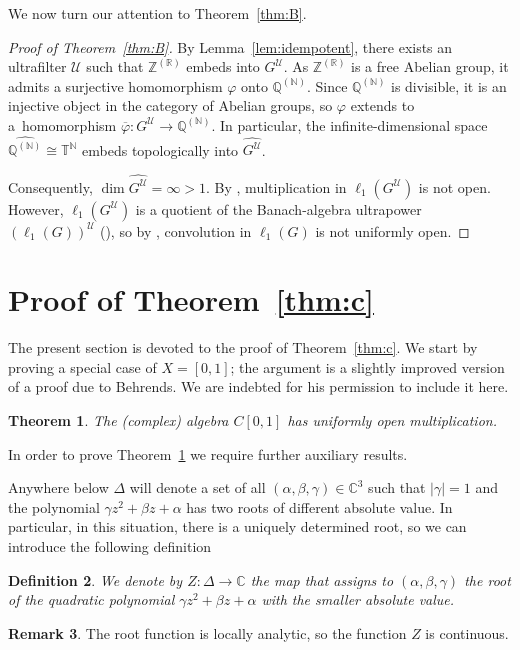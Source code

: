 \documentclass[12pt,fleqn]{amsart}
\newtheorem{theorem}{Theorem}[section]
\newtheorem{definition}[theorem]{Definition}
\theoremstyle{definition}
\newtheorem{remark}[theorem]{Remark}
\numberwithin{equation}{section}
\theoremstyle{remark}
\begin{document}
We now turn our attention to Theorem~\ref{thm:B}.
\begin{proof}[Proof of Theorem~\ref{thm:B}]
    By Lemma~\ref{lem:idempotent}, there exists an ultrafilter $\mathscr{U}$ such that $\mathbb Z^{(\mathbb R)}$ embeds into $G^{\mathscr{U}}$. As $\mathbb Z^{(\mathbb R)}$ is a free Abelian group, it admits a surjective homomorphism $\varphi$ onto $\mathbb{Q}^{(\mathbb N)}$. Since $\mathbb{Q}^{(\mathbb N)}$ is divisible, it is an injective object in the category of Abelian groups, so $\varphi$ extends to a~homomorphism $\overline{\varphi}\colon G^{\mathscr{U}}\to \mathbb{Q}^{(\mathbb N)}$. In particular, the infinite-dimensional space $\widehat{\mathbb{Q}^{(\mathbb N)}}\cong \mathbb T^{\mathbb N}$ embeds topologically into $\widehat{G^{\mathscr{U}}}$. 
    
    Consequently, $\dim \widehat{G^{\mathscr{U}}} = \infty > 1$. By \cite[Corollary 4.10]{DraKa}, multiplication in $\ell_1(G^{\mathscr{U}})$ is not open. However, $\ell_1(G^{\mathscr{U}})$ is a quotient of the Banach-algebra ultrapower $(\ell_1(G))^{\mathscr{U}}$ (\cite[Section 2.3.2]{DraKa}), so by \cite[Corollary 3.3]{DraKa}, convolution in $\ell_1(G)$ is not uniformly open.
\end{proof}

\section{Proof of Theorem~\ref{thm:c}}
The present section is devoted to the proof of Theorem~\ref{thm:c}. We start by proving a special case of $X = [0,1]$; the argument is a slightly improved version of a proof due to Behrends. We are indebted for his permission to include it here.

\begin{theorem}\label{th4.1}    
    The (complex) algebra $C[0,1]$ has uniformly open multiplication.
\end{theorem}

In order to prove Theorem~\ref{th4.1} we require further auxiliary results.

Anywhere below $\Delta$ will denote a set  of all $(\alpha, \beta, \gamma) \in \mathbb{C}^{3}$ such that $|\gamma|=1$ and the polynomial $\gamma z^{2}+\beta z+\alpha$ has two roots of different absolute value. In particular, in this situation, there is a uniquely determined root, so  we can introduce the following definition

\begin{definition}
    We denote by $Z\colon \Delta \rightarrow \mathbb{C}$ the map that assigns to $(\alpha, \beta, \gamma)$ the root of the quadratic polynomial $\gamma z^{2}+\beta z+\alpha$ with the smaller absolute value.
\end{definition}
%
\begin{remark}\label{rm2}
    The root function is locally analytic, so the function $Z$ is continuous.
\end{remark}
\end{document}
